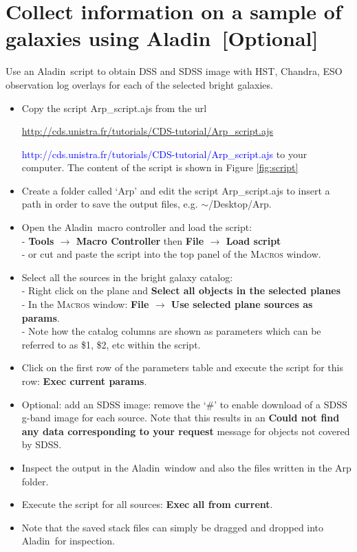 \documentclass [a4paper, 12pt]{article}
\newcommand{\aladin}{{\textsc{A}{ladin}}}
\begin{document}
\section{Collect information on a sample of galaxies using \aladin\ 
[Optional]}

Use an \aladin\ script to obtain DSS and SDSS image with HST, Chandra, ESO 
observation log overlays for each of the selected bright galaxies.

\begin{itemize}
\item Copy the script Arp\_script.ajs from the url 
\begin{tiny}\textcolor{white}{\url{http://cds.unistra.fr/tutorials/CDS-tutorial/Arp_script.ajs}}
\end{tiny} \hspace{-7.7cm} 
\textcolor{blue}{http://cds.unistra.fr/tutorials/CDS-tutorial/Arp\_script.ajs}
to your computer. The content of the script is shown in Figure 
\ref{fig:script}
\item Create a folder called `Arp' and edit the script Arp\_script.ajs 
to insert a path in order to save the output files, e.g. 
$\sim$/Desktop/Arp.
\item Open the \aladin\ macro controller and load the script:\\
- \textbf{Tools $\rightarrow$ Macro Controller} then \textbf{File 
$\rightarrow$ Load script}\\
- or cut and paste the script into the top panel of the \textsc{Macros} 
window.
\item Select all the sources in the bright galaxy catalog:\\
- Right click on the plane and \textbf{Select all objects in the 
selected planes}\\
- In the \textsc{Macros} window: \textbf{File $\rightarrow$ Use 
selected plane sources as params}.\\
- Note how the catalog columns are shown as parameters which can be 
referred to as \$1, \$2, etc within the script.
\item Click on the first row of the parameters table and execute the 
script for this row: \textbf{Exec current params}.
\item Optional: add an SDSS image: remove the `\#' to enable download 
of a SDSS g-band image for each source. Note that this results in an 
\textbf{Could not find any data corresponding to your request} message 
for objects not covered by SDSS.
\item Inspect the output in the \aladin\ window and also the files 
written in the Arp folder.
\item Execute the script for all sources: \textbf{Exec all from 
current}.
\item Note that the saved stack files can simply be dragged and dropped 
into \aladin\ for inspection.
\end{itemize}
\end{document}
